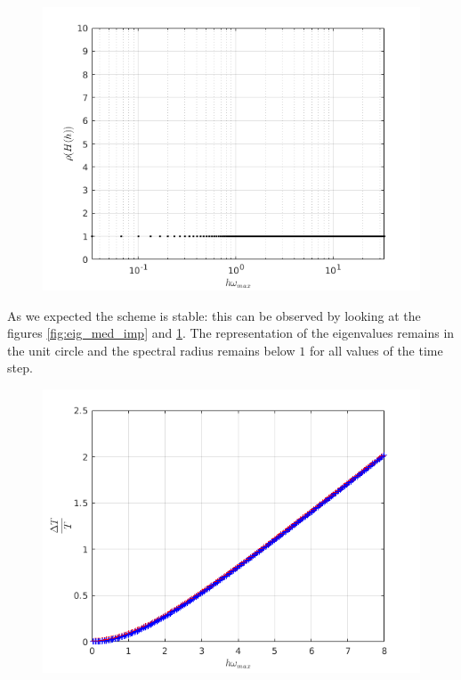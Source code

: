 \begin{itemize}
\begin{figure}[H]
\begin{minipage}{.5\textwidth}
  \centering
  \includegraphics[width=.98\linewidth]{images/spect_rad_med_imp.png}
  \label{fig:spect_rad_med_imp}
\end{minipage}
\end{figure}  
As we expected the scheme is stable: this can be observed by looking at the figures \ref{fig:eig_med_imp} and \ref{fig:spect_rad_med_imp}. The representation of the eigenvalues remains in the unit circle and the spectral radius remains below $1$ for all values of the time step.
\begin{figure}[H]
\centering
\begin{minipage}{.5\textwidth}
  \centering
  \includegraphics[width=1.\linewidth]{images/per_err_med_imp.png}

\end{minipage}
\end{figure}
\end{itemize}
